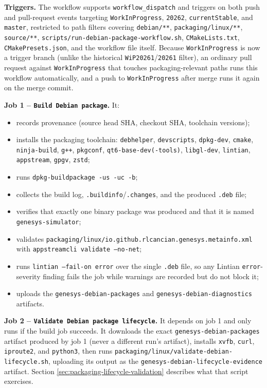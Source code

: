 \noindent\textbf{Triggers.} The workflow supports \texttt{workflow\_dispatch}
and triggers on both push and pull-request events targeting
\texttt{WorkInProgress}, \texttt{20262}, \texttt{currentStable}, and
\texttt{master}, restricted to path filters covering \texttt{debian/**},
\texttt{packaging/linux/**}, \texttt{source/**},
\texttt{scripts/run-debian-package-workflow.sh}, \texttt{CMakeLists.txt},
\texttt{CMakePresets.json}, and the workflow file itself. Because
\texttt{WorkInProgress} is now a trigger branch (unlike the historical
\texttt{WiP20261}/\texttt{20261} filter), an ordinary pull request against
\texttt{WorkInProgress} that touches packaging-relevant paths runs this
workflow automatically, and a push to \texttt{WorkInProgress} after merge
runs it again on the merge commit.

\noindent\textbf{Job 1 -- \texttt{Build Debian package}.} It:
\begin{itemize}
\item records provenance (source head SHA, checkout SHA, toolchain versions);
\item installs the packaging toolchain: \texttt{debhelper}, \texttt{devscripts},
  \texttt{dpkg-dev}, \texttt{cmake}, \texttt{ninja-build}, \texttt{g++},
  \texttt{pkgconf}, \texttt{qt6-base-dev(-tools)}, \texttt{libgl-dev},
  \texttt{lintian}, \texttt{appstream}, \texttt{gpgv}, \texttt{zstd};
\item runs \texttt{dpkg-buildpackage -us -uc -b};
\item collects the build log, \texttt{.buildinfo}/\texttt{.changes}, and the
  produced \texttt{.deb} file;
\item verifies that exactly one binary package was produced and that it is
  named \texttt{genesys-simulator};
\item validates
  \texttt{packaging/linux/io.github.rlcancian.genesys.metainfo.xml} with
  \texttt{appstreamcli validate --no-net};
\item runs \texttt{lintian --fail-on error} over the single \texttt{.deb}
  file, so any Lintian \texttt{error}-severity finding fails the job while
  warnings are recorded but do not block it;
\item uploads the \texttt{genesys-debian-packages} and
  \texttt{genesys-debian-diagnostics} artifacts.
\end{itemize}

\noindent\textbf{Job 2 -- \texttt{Validate Debian package lifecycle}.} It
depends on job 1 and only runs if the build job succeeds. It downloads the
exact \texttt{genesys-debian-packages} artifact produced by job 1 (never a
different run's artifact), installs \texttt{xvfb}, \texttt{curl},
\texttt{iproute2}, and \texttt{python3}, then runs
\texttt{packaging/linux/validate-debian-lifecycle.sh}, uploading its output
as the \texttt{genesys-debian-lifecycle-evidence} artifact. Section
\ref{sec:packaging-lifecycle-validation} describes what that script exercises.

